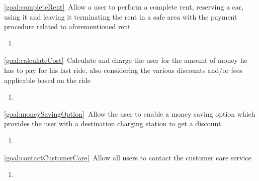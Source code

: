 \begin{description}
\begin{enumerate}[label=\textbf{R\arabic*}]
   			\end{enumerate}
  		\item \ref{goal:completeRent}\ Allow a user to perform a complete rent, reserving a car, using
  		it and leaving it terminating the rent in a safe area with the payment procedure related to
  		aforementioned rent 
  			\begin{enumerate}[label=\textbf{R\arabic*}]
  				\item
   			\end{enumerate}
  		\item \ref{goal:calculateCost}\ Calculate and charge the user for the amount of money he has
  		to pay for his last ride, also considering the various discounts and/or fees applicable based on
  		the ride
  			\begin{enumerate}[label=\textbf{R\arabic*}]
  				\item
   			\end{enumerate}
  		\item \ref{goal:moneySavingOption}\ Allow the user to enable a money saving option which
  		provides the user with a destination charging station to get a discount
  			\begin{enumerate}[label=\textbf{R\arabic*}]
  				\item
   			\end{enumerate}
  		\item \ref{goal:contactCustomerCare}\ Allow all users to contact the customer care service
  			\begin{enumerate}[label=\textbf{R\arabic*}]
  				\item
   			\end{enumerate}
  	\end{description}

